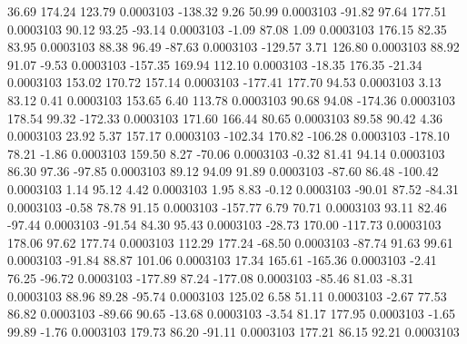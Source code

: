        36.69      174.24      123.79     0.0003103
     -138.32        9.26       50.99     0.0003103
      -91.82       97.64      177.51     0.0003103
       90.12       93.25      -93.14     0.0003103
       -1.09       87.08        1.09     0.0003103
      176.15       82.35       83.95     0.0003103
       88.38       96.49      -87.63     0.0003103
     -129.57        3.71      126.80     0.0003103
       88.92       91.07       -9.53     0.0003103
     -157.35      169.94      112.10     0.0003103
      -18.35      176.35      -21.34     0.0003103
      153.02      170.72      157.14     0.0003103
     -177.41      177.70       94.53     0.0003103
        3.13       83.12        0.41     0.0003103
      153.65        6.40      113.78     0.0003103
       90.68       94.08     -174.36     0.0003103
      178.54       99.32     -172.33     0.0003103
      171.60      166.44       80.65     0.0003103
       89.58       90.42        4.36     0.0003103
       23.92        5.37      157.17     0.0003103
     -102.34      170.82     -106.28     0.0003103
     -178.10       78.21       -1.86     0.0003103
      159.50        8.27      -70.06     0.0003103
       -0.32       81.41       94.14     0.0003103
       86.30       97.36      -97.85     0.0003103
       89.12       94.09       91.89     0.0003103
      -87.60       86.48     -100.42     0.0003103
        1.14       95.12        4.42     0.0003103
        1.95        8.83       -0.12     0.0003103
      -90.01       87.52      -84.31     0.0003103
       -0.58       78.78       91.15     0.0003103
     -157.77        6.79       70.71     0.0003103
       93.11       82.46      -97.44     0.0003103
      -91.54       84.30       95.43     0.0003103
      -28.73      170.00     -117.73     0.0003103
      178.06       97.62      177.74     0.0003103
      112.29      177.24      -68.50     0.0003103
      -87.74       91.63       99.61     0.0003103
      -91.84       88.87      101.06     0.0003103
       17.34      165.61     -165.36     0.0003103
       -2.41       76.25      -96.72     0.0003103
     -177.89       87.24     -177.08     0.0003103
      -85.46       81.03       -8.31     0.0003103
       88.96       89.28      -95.74     0.0003103
      125.02        6.58       51.11     0.0003103
       -2.67       77.53       86.82     0.0003103
      -89.66       90.65      -13.68     0.0003103
       -3.54       81.17      177.95     0.0003103
       -1.65       99.89       -1.76     0.0003103
      179.73       86.20      -91.11     0.0003103
      177.21       86.15       92.21     0.0003103
